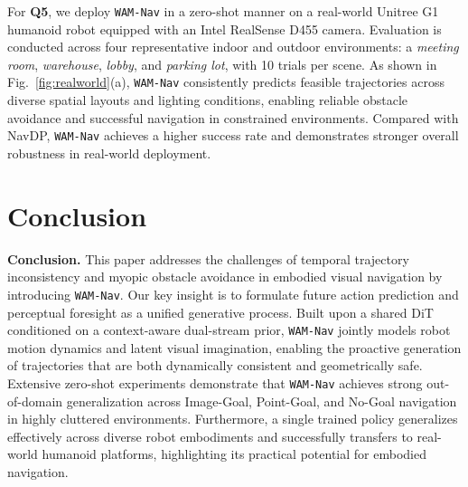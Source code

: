 \documentclass{article}
\begin{document}

For \textbf{Q5}, we deploy \texttt{WAM-Nav} in a zero-shot manner on a real-world Unitree G1 humanoid robot equipped with an Intel RealSense D455 camera. Evaluation is conducted across four representative indoor and outdoor environments: a \textit{meeting room}, \textit{warehouse}, \textit{lobby}, and \textit{parking lot}, with 10 trials per scene. As shown in Fig.~\ref{fig:realworld}(a), \texttt{WAM-Nav} consistently predicts feasible trajectories across diverse spatial layouts and lighting conditions, enabling reliable obstacle avoidance and successful navigation in constrained environments. Compared with NavDP, \texttt{WAM-Nav} achieves a higher success rate and demonstrates stronger overall robustness in real-world deployment.


\section{Conclusion}
\label{sec:conclusion}

\textbf{Conclusion.}
This paper addresses the challenges of temporal trajectory inconsistency and myopic obstacle avoidance in embodied visual navigation by introducing \texttt{WAM-Nav}. Our key insight is to formulate future action prediction and perceptual foresight as a unified generative process. Built upon a shared DiT conditioned on a context-aware dual-stream prior, \texttt{WAM-Nav} jointly models robot motion dynamics and latent visual imagination, enabling the proactive generation of trajectories that are both dynamically consistent and geometrically safe. Extensive zero-shot experiments demonstrate that \texttt{WAM-Nav} achieves strong out-of-domain generalization across Image-Goal, Point-Goal, and No-Goal navigation in highly cluttered environments. Furthermore, a single trained policy generalizes effectively across diverse robot embodiments and successfully transfers to real-world humanoid platforms, highlighting its practical potential for embodied navigation.
\end{document}
